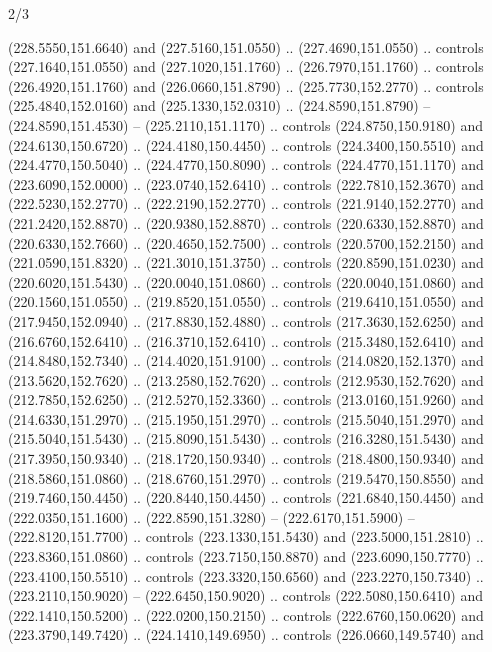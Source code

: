 \begin{flagdescription}{2/3}
\begin{scope}[xshift=0.5\flaglength,yshift=0.5\flagwidth,scale=\flagwidth/259.2]
\begin{scope}[y=0.8pt, x=0.8pt, yscale=-1,shift={(-243,-162)}]
      (228.5550,151.6640) and (227.5160,151.0550) .. (227.4690,151.0550) .. controls
      (227.1640,151.0550) and (227.1020,151.1760) .. (226.7970,151.1760) .. controls
      (226.4920,151.1760) and (226.0660,151.8790) .. (225.7730,152.2770) .. controls
      (225.4840,152.0160) and (225.1330,152.0310) .. (224.8590,151.8790) --
      (224.8590,151.4530) -- (225.2110,151.1170) .. controls (224.8750,150.9180) and
      (224.6130,150.6720) .. (224.4180,150.4450) .. controls (224.3400,150.5510) and
      (224.4770,150.5040) .. (224.4770,150.8090) .. controls (224.4770,151.1170) and
      (223.6090,152.0000) .. (223.0740,152.6410) .. controls (222.7810,152.3670) and
      (222.5230,152.2770) .. (222.2190,152.2770) .. controls (221.9140,152.2770) and
      (221.2420,152.8870) .. (220.9380,152.8870) .. controls (220.6330,152.8870) and
      (220.6330,152.7660) .. (220.4650,152.7500) .. controls (220.5700,152.2150) and
      (221.0590,151.8320) .. (221.3010,151.3750) .. controls (220.8590,151.0230) and
      (220.6020,151.5430) .. (220.0040,151.0860) .. controls (220.0040,151.0860) and
      (220.1560,151.0550) .. (219.8520,151.0550) .. controls (219.6410,151.0550) and
      (217.9450,152.0940) .. (217.8830,152.4880) .. controls (217.3630,152.6250) and
      (216.6760,152.6410) .. (216.3710,152.6410) .. controls (215.3480,152.6410) and
      (214.8480,152.7340) .. (214.4020,151.9100) .. controls (214.0820,152.1370) and
      (213.5620,152.7620) .. (213.2580,152.7620) .. controls (212.9530,152.7620) and
      (212.7850,152.6250) .. (212.5270,152.3360) .. controls (213.0160,151.9260) and
      (214.6330,151.2970) .. (215.1950,151.2970) .. controls (215.5040,151.2970) and
      (215.5040,151.5430) .. (215.8090,151.5430) .. controls (216.3280,151.5430) and
      (217.3950,150.9340) .. (218.1720,150.9340) .. controls (218.4800,150.9340) and
      (218.5860,151.0860) .. (218.6760,151.2970) .. controls (219.5470,150.8550) and
      (219.7460,150.4450) .. (220.8440,150.4450) .. controls (221.6840,150.4450) and
      (222.0350,151.1600) .. (222.8590,151.3280) -- (222.6170,151.5900) --
      (222.8120,151.7700) .. controls (223.1330,151.5430) and (223.5000,151.2810) ..
      (223.8360,151.0860) .. controls (223.7150,150.8870) and (223.6090,150.7770) ..
      (223.4100,150.5510) .. controls (223.3320,150.6560) and (223.2270,150.7340) ..
      (223.2110,150.9020) -- (222.6450,150.9020) .. controls (222.5080,150.6410) and
      (222.1410,150.5200) .. (222.0200,150.2150) .. controls (222.6760,150.0620) and
      (223.3790,149.7420) .. (224.1410,149.6950) .. controls (226.0660,149.5740) and

\end{scope}
\end{scope}
\end{flagdescription}
